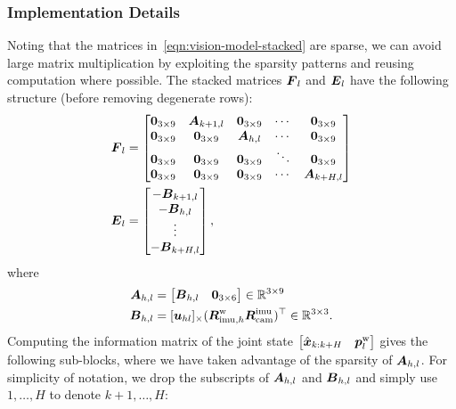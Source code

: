 \subsubsection{Implementation Details}
Noting that the matrices in~\eqref{eqn:vision-model-stacked} are sparse, we can avoid large matrix multiplication by exploiting the sparsity patterns and reusing computation where possible.
The stacked matrices $\boldsymbol F_l$ and $\boldsymbol E_l$ have the following structure (before removing degenerate rows):
\begin{align}
\boldsymbol F_l &=
\begin{bmatrix}
\boldsymbol 0_{3\times9} & \boldsymbol A_{k+1,l} & \boldsymbol 0_{3\times9} & \cdots & \boldsymbol 0_{3\times9} \\
\boldsymbol 0_{3\times9} & \boldsymbol 0_{3\times9} & \boldsymbol A_{h,l} & \cdots & \boldsymbol 0_{3\times9} \\
\boldsymbol 0_{3\times9} & \boldsymbol 0_{3\times9} & \boldsymbol 0_{3\times9} & \ddots & \boldsymbol 0_{3\times9} \\
\boldsymbol 0_{3\times9} & \boldsymbol 0_{3\times9} & \boldsymbol 0_{3\times9} & \cdots & \boldsymbol A_{k+H,l} \\
\end{bmatrix}\\
\boldsymbol E_l &=
\begin{bmatrix}
-\boldsymbol B_{k+1,l}\\
-\boldsymbol B_{h,l}\\
\vdots\\
-\boldsymbol B_{k+H,l}\\
\end{bmatrix},
\end{align}
where
\begin{align}
\boldsymbol A_{h,l} &= \begin{bmatrix}\boldsymbol B_{h,l} & \boldsymbol 0_{3\times 6}\end{bmatrix}\in\mathbb{R}^{3\times9}\\
\boldsymbol B_{h,l} &= [\boldsymbol u_{hl}]_\times(\boldsymbol R^\text{w}_{\text{imu},h}\boldsymbol R^\text{imu}_\text{cam})^\top\in\mathbb{R}^{3\times3}.
\end{align}
Computing the information matrix of the joint state $\begin{bmatrix}\hat{\boldsymbol x}_{k:k+H}&\boldsymbol p^\text{w}_l\end{bmatrix}$ gives the following sub-blocks, where we have taken advantage of the sparsity of $\boldsymbol A_{h,l}$.
For simplicity of notation, we drop the subscripts of $\boldsymbol A_{h,l}$ and $\boldsymbol B_{h,l}$ and simply use $1,\dots,H$ to denote $k+1,\dots,H$:
